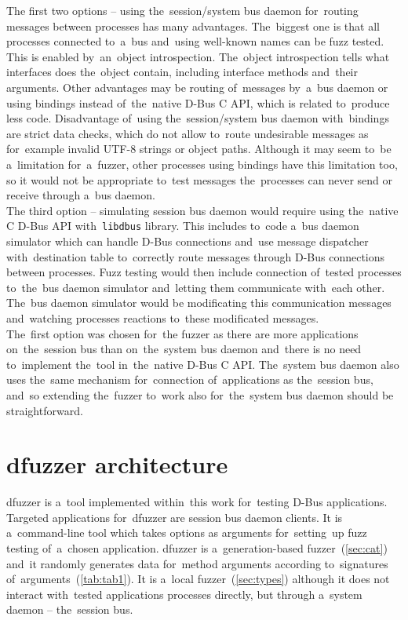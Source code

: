 The first two options -- using the~session/system bus daemon for~routing messages
between processes has many advantages. The~biggest one is that all processes
connected to~a~bus and~using well-known names can be fuzz tested. This is
enabled by~an~object introspection. The~object introspection tells what interfaces
does the~object contain, including interface methods and~their arguments. Other
advantages may be routing of~messages by~a~bus daemon or using bindings instead
of~the~native D-Bus C API, which is related to~produce less code. Disadvantage
of~using the~session/system bus daemon with~bindings are strict data checks, which
do not allow to~route undesirable messages as for~example invalid UTF-8 strings
or object paths. Although it may seem to~be a~limitation for~a~fuzzer, other
processes using bindings have this limitation too, so it would not be appropriate
to~test messages the~processes can never send or receive through a~bus daemon.\\

The third option -- simulating session bus daemon would require using the~native C
D-Bus API with~\texttt{libdbus} library. This includes to~code a~bus daemon simulator
which can handle D-Bus connections and~use message dispatcher with~destination
table to~correctly route messages through D-Bus connections between processes.
Fuzz testing would then include connection of~tested processes to~the~bus daemon
simulator and~letting them communicate with~each other. The~bus daemon simulator
would be modificating this communication messages and~watching processes reactions
to~these modificated messages.\\

The~first option was chosen for~the fuzzer as there are more applications
on~the~session bus than on~the~system bus daemon and~there is no need to~implement
the~tool in~the~native D-Bus C API. The~system bus daemon also uses the~same
mechanism for~connection of~applications as the~session bus, and~so extending
the~fuzzer to~work also for~the~system bus daemon should be straightforward.


\section{dfuzzer architecture}
dfuzzer is a~tool implemented within~this work for~testing D-Bus applications.
Targeted applications for~dfuzzer are session bus daemon clients. It is
a~command-line tool which takes options as arguments for~setting~up fuzz testing
of~a~chosen application. dfuzzer is a~generation-based fuzzer~(\ref{sec:cat})
and~it randomly generates data for~method arguments according
to~signatures of~arguments~(\ref{tab:tab1}). It is a~local fuzzer~(\ref{sec:types})
although it does not interact with~tested applications processes directly, but
through a~system daemon -- the~session bus.

